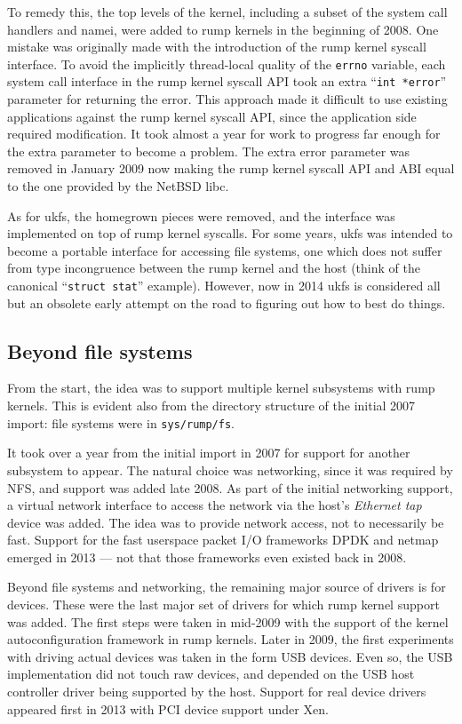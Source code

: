 To remedy this, the top levels of the kernel, including a subset of
the system call handlers and namei, were added to rump kernels in
the beginning of 2008.  One mistake was originally made with the
introduction of the rump kernel syscall interface.  To avoid the
implicitly thread-local quality of the \texttt{errno} variable, each
system call interface in the rump kernel syscall API took an extra
``\verb+int *error+'' parameter for returning the error.  This approach
made it difficult to use existing applications against the rump
kernel syscall API, since the application side required modification.
It took almost a year for work to progress far enough for the extra
parameter to become a problem.  The extra error parameter was removed
in January 2009 now making the rump kernel syscall API and ABI equal to
the one provided by the NetBSD libc.

As for ukfs, the homegrown pieces were removed, and the interface was
implemented on top of rump kernel syscalls.  For some years, ukfs was
intended to become a portable interface for accessing file systems,
\ie one which does not suffer from type incongruence between the rump
kernel and the host (think of the canonical ``\verb+struct stat+''
example).  However, now in 2014 ukfs is considered all but an obsolete
early attempt on the road to figuring out how to best do things.


\subsection{Beyond file systems}

From the start, the idea was to support multiple kernel subsystems with
rump kernels.  This is evident also from the directory structure of the
initial 2007 import: file systems were in \texttt{sys/rump/fs}.

It took over a year from the initial import in 2007 for support for
another subsystem to appear.  The natural choice was networking, since
it was required by NFS, and support was added late 2008.  As part of
the initial networking support, a virtual network interface to access
the network via the host's \textit{Ethernet tap} device was added.
The idea was to provide network access, not to necessarily be fast.
Support for the fast userspace packet I/O frameworks DPDK and
netmap emerged in 2013 --- not that those frameworks even existed back
in 2008.

Beyond file systems and networking, the remaining major source of
drivers is for devices.  These were the last major set of drivers
for which rump kernel support was added.  The first steps were taken
in mid-2009 with the support of the kernel autoconfiguration framework
in rump kernels.  Later in 2009, the first experiments with driving
actual devices was taken in the form USB devices.  Even so, the USB
implementation did not touch raw devices, and depended on the USB host
controller driver being supported by the host.  Support for real device
drivers appeared first in 2013 with PCI device support under Xen.


